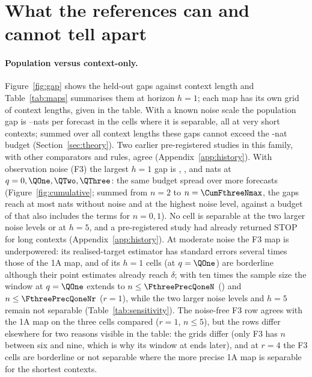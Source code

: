 \section{What the references can and cannot tell apart}\label{sec:results}
\paragraph{Population versus context-only.} Figure~\ref{fig:gap} shows the held-out gaps against context length and
Table~\ref{tab:maps} summarises them at horizon $h=1$; each map has its own grid of context lengths, given in the table. With a known noise scale the population gap is
\OneAGapMin--\OneAGapMax nats per forecast in the cells where it is separable, all at very short contexts; summed over all
context lengths these gaps cannot exceed the \KLoneA-nat budget (Section~\ref{sec:theory}). Two earlier pre-registered
studies in this family, with other comparators and rules, agree (Appendix~\ref{app:history}). With observation noise (F3) the largest $h=1$ gap is \FthreeGapQzero, \FthreeGapQone, \FthreeGapQtwo and
\FthreeGapQthree nats at $q=0,\QOne,\QTwo,\QThree$: the same budget spread over more forecasts (Figure~\ref{fig:cumulative};
summed from $n=2$ to $n=\CumFthreeNmax$, the gaps reach at most \CumFthreeClean nats without noise and \CumFthreeNoisy at the
highest noise level, against a budget of \KLoneA that also includes the terms for $n=0,1$). No cell is separable at the
two larger noise levels or at $h=5$, and a pre-registered study had already returned STOP for long contexts
(Appendix~\ref{app:history}). At
moderate noise the F3 map is underpowered: its realised-target estimator has standard errors several times those of the 1A
map, and \FthreeBorderline of its $h=1$ cells (\FthreeBorderlineQone at $q=\QOne$) are borderline although their point
estimates already reach $\delta$; with ten times the sample size the window at $q=\QOne$ extends to $n\le\FthreePrecQoneN$
(\rsmall) and $n\le\FthreePrecQoneNr$ ($r=1$), while the two larger noise levels and $h=5$ remain not separable
(Table~\ref{tab:sensitivity}). The noise-free F3 row agrees with the 1A map on the three cells compared ($r=1$, $n\le 5$),
but the rows differ elsewhere for two reasons visible in the table: the grids differ (only F3 has $n$ between six and nine,
which is why its window at \rsmall ends later), and at $r=4$ the F3 cells are borderline or not separable where the more
precise 1A map is separable for the shortest contexts.

